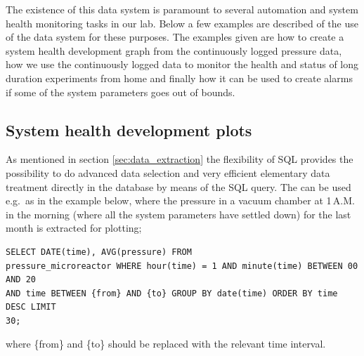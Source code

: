 The existence of this data system is paramount to several automation
and system health monitoring tasks in our lab. Below a few examples
are described of the use of the data system for these purposes. The
examples given are how to create a system health development graph
from the continuously logged pressure data, how we use the
continuously logged data to monitor the health and status of long
duration experiments from home and finally how it can be used to
create alarms if some of the system parameters goes out of bounds.

\subsection{System health development plots}
\label{sec:morning_pressure}

As mentioned in section \ref{sec:data_extraction} the flexibility of
SQL provides the possibility to do advanced data selection and very
efficient elementary data treatment directly in the database by means
of the SQL query. The can be used e.g.\ as in the example below, where
the pressure in a vacuum chamber at 1\,A.M. in the morning (where all
the system parameters have settled down) for the last month is
extracted for plotting;
\begin{verbatim} 
SELECT DATE(time), AVG(pressure) FROM
pressure_microreactor WHERE hour(time) = 1 AND minute(time) BETWEEN 00 AND 20
AND time BETWEEN {from} AND {to} GROUP BY date(time) ORDER BY time DESC LIMIT
30;
\end{verbatim}
where \{from\}  and \{to\} should be replaced with the
relevant time interval.

